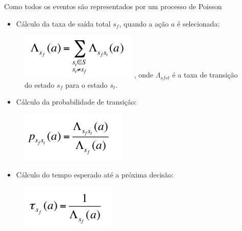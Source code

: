 \begin{frame}{\small Como todos os eventos são representados por um processo de Poisson}
    \begin{itemize} 
      \item \footnotesize Cálculo da taxa de saída total \alert{$s _{f}$}, quando a ação \alert{$a$} é selecionada:
    \end{itemize} 
     
    \begin{figure} 
      \includegraphics[scale=0.37]{./Figures/form1} 
      \scriptsize , onde $\Lambda _{sf st}$ é a taxa de transição do estado $s_{f}$ para o estado $s_{t}$.
    \end{figure}  
    
    \begin{itemize}
      \item \footnotesize Cálculo da probabilidade de transição:
    \end{itemize}
    
    \begin{figure} 
      \includegraphics[scale=0.37]{./Figures/form2} 
    \end{figure}
    
    \begin{itemize}
      \item \footnotesize Cálculo do tempo esperado até a próxima decisão:
    \end{itemize}
    
    \begin{figure} 
      \includegraphics[scale=0.37]{./Figures/form3} 
    \end{figure}
\end{frame}


